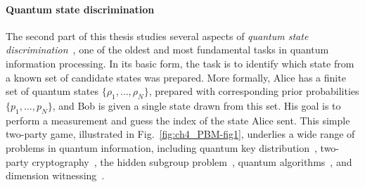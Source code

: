 \paragraph{Quantum state discrimination}

The second part of this thesis studies several aspects of \emph{quantum state discrimination}~\cite{bae2015quantum}, one of the oldest and most fundamental tasks in quantum information processing. 
In its basic form, the task is to identify which state from a known set of candidate states was prepared. 
More formally, Alice has a finite set of quantum states $\{\rho_1,\ldots,\rho_N\}$, prepared with corresponding prior probabilities $\{p_1,\ldots,p_N\}$, and Bob is given a single state drawn from this set. 
His goal is to perform a measurement and guess the index of the state Alice sent. 
This simple two-party game, illustrated in Fig.~\ref{fig:ch4_PBM-fig1}, underlies a wide range of problems in quantum information, including quantum key distribution~\cite{ko2018advanced}, two-party cryptography~\cite{aharonov2000quantum, van2002unambiguous, cabello2000quantum, ambainis2001new, sikora2017simple}, the hidden subgroup problem~\cite{hayashi2008quantum}, quantum algorithms~\cite{radhakrishnan2009random, hayashi2008quantum}, and dimension witnessing~\cite{strubi2013measuring}.


